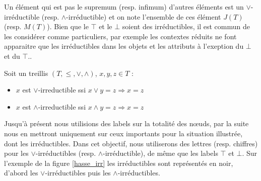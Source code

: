 Un élément qui est pas le supremum (resp. infimum) d'autres éléments est un $\vee$-irréductible (resp. $\wedge$-irréductible) et on note l'ensemble de ces élément $J(T)$ (resp. $M(T)$). Bien que le $\top$ et le $\bot$ soient des irréductibles, il est commun de les considérer comme particuliers, par exemple les contextes réduits ne font apparaitre que les irréductibles dans les objets et les attributs à l'exeption du $\bot$ et du $\top$..

\begin{definition}
Soit un treillis $(T, \leq, \vee, \wedge)$, $x, y, z \in T$ :
\begin{itemize}
	\item $x$ est $\vee$-irreductible ssi $x \vee y = z \Rightarrow x = z$
	\item $x$ est $\wedge$-irreductible ssi $x \wedge y = z \Rightarrow x = z$
\end{itemize}
\end{definition}

Jusqu'à présent nous utilisions des labels sur la totalité des n\oe uds, par la suite nous en mettront uniquement sur ceux importants pour la situation illustrée, dont les irréductibles. Dans cet objectif, nous utiliserons des lettres (resp. chiffres) pour les $\vee$-irréductibles (resp. $\wedge$-irréductible), de même que les labels $\top$ et $\bot$. Sur l'exemple de la figure \ref{hasse_irr} les irréductibles sont représentés en noir, d'abord les $\vee$-irréductibles puis les $\wedge$-irréductibles.

